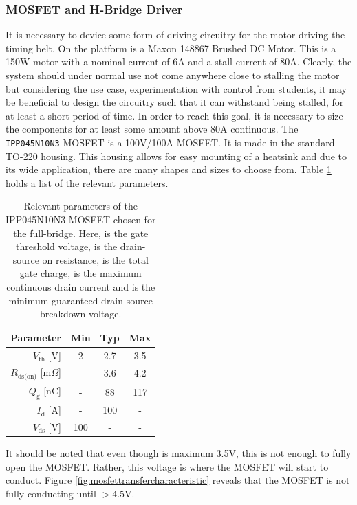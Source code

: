 \subsubsection{MOSFET and H-Bridge Driver} %
\label{ssub:h_bridge}
It is necessary to device some form of driving circuitry for the motor driving the timing belt.
On the platform is a Maxon 148867 Brushed DC Motor.
This is a 150W motor with a nominal current of 6A and a stall current of 80A.
Clearly, the system should under normal use not come anywhere close to stalling the motor but considering the use case, experimentation with control from students, it may be beneficial to design the circuitry such that it can withstand being stalled, for at least a short period of time.
In order to reach this goal, it is necessary to size the components for at least some amount above 80A continuous.
The \texttt{IPP045N10N3} MOSFET \cite{mosfet} is a 100V/100A MOSFET.
It is made in the standard TO-220 housing.
This housing allows for easy mounting of a heatsink and due to its wide application, there are many shapes and sizes to choose from.
Table \ref{tab:mosfetparameters} holds a list of the relevant parameters.

\begin{table}[tb]
	\centering
	\begin{tabular}{|r|c|c|c|}
	\hline
		\textbf{Parameter} & \textbf{Min} & \textbf{Typ} & \textbf{Max} \\
	\hline
		$V_{\text{th}}$ [V] & 2 & 2.7 & 3.5 \\
	\hline
		$R_{\text{ds(on)}}$ [m$\Omega$]& - & 3.6 & 4.2 \\
	\hline
		$Q_\text{g}$ [nC] & - & 88 & 117 \\
	\hline
		$I_\text{d}$ [A] & - & 100 & - \\
	\hline
		$V_{\text{ds}}$ [V] & 100 & - & - \\
	\hline
	\end{tabular}
	\caption{Relevant parameters of the IPP045N10N3 MOSFET \cite{mosfet} chosen for the full-bridge.
	Here, \vth is the gate threshold voltage, \ron is the drain-source on resistance, \qg is the total gate charge, \id is the maximum continuous drain current and \vds is the minimum guaranteed drain-source breakdown voltage.}
	\label{tab:mosfetparameters}
\end{table}

It should be noted that even though \vth is maximum 3.5V, this is not enough to fully open the MOSFET.
Rather, this voltage is where the MOSFET will start to conduct.
Figure \ref{fig:mosfettransfercharacteristic} reveals that the MOSFET is not fully conducting until \vgs $>4.5$V.

